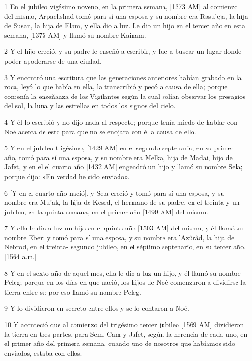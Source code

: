 \par 1 En el jubileo vigésimo noveno, en la primera semana, [1373 AM] al comienzo del mismo, Arpachshad tomó para sí una esposa y su nombre era Rasu'eja, la hija de Susan, la hija de Elam, y ella dio a luz. Le dio un hijo en el tercer año en esta semana, [1375 AM] y llamó su nombre Kainam.
\par 2 Y el hijo creció, y su padre le enseñó a escribir, y fue a buscar un lugar donde poder apoderarse de una ciudad.
\par 3 Y encontró una escritura que las generaciones anteriores habían grabado en la roca, leyó lo que había en ella, la transcribió y pecó a causa de ella; porque contenía la enseñanza de los Vigilantes según la cual solían observar los presagios del sol, la luna y las estrellas en todos los signos del cielo.
\par 4 Y él lo escribió y no dijo nada al respecto; porque tenía miedo de hablar con Noé acerca de esto para que no se enojara con él a causa de ello.
\par 5 Y en el jubileo trigésimo, [1429 AM] en el segundo septenario, en su primer año, tomó para sí una esposa, y su nombre era Melka, hija de Madai, hijo de Jafet, y en el el cuarto año [1432 AM] engendró un hijo y llamó su nombre Sela; porque dijo: «En verdad he sido enviado».
\par 6 [Y en el cuarto año nació], y Sela creció y tomó para sí una esposa, y su nombre era Mu'ak, la hija de Kesed, el hermano de su padre, en el treinta y un jubileo, en la quinta semana, en el primer año [1499 AM] del mismo.
\par 7 Y ella le dio a luz un hijo en el quinto año [1503 AM] del mismo, y él llamó su nombre Eber; y tomó para sí una esposa, y su nombre era 'Azûrâd, la hija de Nebrod, en el treinta- segundo jubileo, en el séptimo septenario, en su tercer año. [1564 a.m.]
\par 8 Y en el sexto año de aquel mes, ella le dio a luz un hijo, y él llamó su nombre Peleg; porque en los días en que nació, los hijos de Noé comenzaron a dividirse la tierra entre sí: por eso llamó su nombre Peleg.
\par 9 Y lo dividieron en secreto entre ellos y se lo contaron a Noé.
\par 10 Y aconteció que al comienzo del trigésimo tercer jubileo [1569 AM] dividieron la tierra en tres partes, para Sem, Cam y Jafet, según la herencia de cada uno, en el primer año del primera semana, cuando uno de nosotros que habíamos sido enviados, estaba con ellos.
